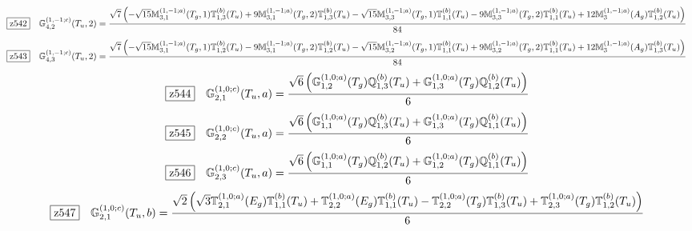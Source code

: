 \documentclass[fleqn,10pt,landscape]{jsarticle}
\begin{document}
\begin{dmath*}
\hspace*{3mm}\fbox{z542}\quad \mathbb{G}_{4,2}^{(1,-1;c)}(T_{u},2)=\frac{\sqrt{7} \left(- \sqrt{15} \mathbb{M}_{3,1}^{(1,-1;a)}(T_{g},1) \mathbb{T}_{1,3}^{(b)}(T_{u}) + 9 \mathbb{M}_{3,1}^{(1,-1;a)}(T_{g},2) \mathbb{T}_{1,3}^{(b)}(T_{u}) - \sqrt{15} \mathbb{M}_{3,3}^{(1,-1;a)}(T_{g},1) \mathbb{T}_{1,1}^{(b)}(T_{u}) - 9 \mathbb{M}_{3,3}^{(1,-1;a)}(T_{g},2) \mathbb{T}_{1,1}^{(b)}(T_{u}) + 12 \mathbb{M}_{3}^{(1,-1;a)}(A_{g}) \mathbb{T}_{1,2}^{(b)}(T_{u})\right)}{84}
\end{dmath*}
\begin{dmath*}
\hspace*{3mm}\fbox{z543}\quad \mathbb{G}_{4,3}^{(1,-1;c)}(T_{u},2)=\frac{\sqrt{7} \left(- \sqrt{15} \mathbb{M}_{3,1}^{(1,-1;a)}(T_{g},1) \mathbb{T}_{1,2}^{(b)}(T_{u}) - 9 \mathbb{M}_{3,1}^{(1,-1;a)}(T_{g},2) \mathbb{T}_{1,2}^{(b)}(T_{u}) - \sqrt{15} \mathbb{M}_{3,2}^{(1,-1;a)}(T_{g},1) \mathbb{T}_{1,1}^{(b)}(T_{u}) + 9 \mathbb{M}_{3,2}^{(1,-1;a)}(T_{g},2) \mathbb{T}_{1,1}^{(b)}(T_{u}) + 12 \mathbb{M}_{3}^{(1,-1;a)}(A_{g}) \mathbb{T}_{1,3}^{(b)}(T_{u})\right)}{84}
\end{dmath*}
\begin{dmath*}
\hspace*{3mm}\fbox{z544}\quad \mathbb{G}_{2,1}^{(1,0;c)}(T_{u},a)=\frac{\sqrt{6} \left(\mathbb{G}_{1,2}^{(1,0;a)}(T_{g}) \mathbb{Q}_{1,3}^{(b)}(T_{u}) + \mathbb{G}_{1,3}^{(1,0;a)}(T_{g}) \mathbb{Q}_{1,2}^{(b)}(T_{u})\right)}{6}
\end{dmath*}
\begin{dmath*}
\hspace*{3mm}\fbox{z545}\quad \mathbb{G}_{2,2}^{(1,0;c)}(T_{u},a)=\frac{\sqrt{6} \left(\mathbb{G}_{1,1}^{(1,0;a)}(T_{g}) \mathbb{Q}_{1,3}^{(b)}(T_{u}) + \mathbb{G}_{1,3}^{(1,0;a)}(T_{g}) \mathbb{Q}_{1,1}^{(b)}(T_{u})\right)}{6}
\end{dmath*}
\begin{dmath*}
\hspace*{3mm}\fbox{z546}\quad \mathbb{G}_{2,3}^{(1,0;c)}(T_{u},a)=\frac{\sqrt{6} \left(\mathbb{G}_{1,1}^{(1,0;a)}(T_{g}) \mathbb{Q}_{1,2}^{(b)}(T_{u}) + \mathbb{G}_{1,2}^{(1,0;a)}(T_{g}) \mathbb{Q}_{1,1}^{(b)}(T_{u})\right)}{6}
\end{dmath*}
\begin{dmath*}
\hspace*{3mm}\fbox{z547}\quad \mathbb{G}_{2,1}^{(1,0;c)}(T_{u},b)=\frac{\sqrt{2} \left(\sqrt{3} \mathbb{T}_{2,1}^{(1,0;a)}(E_{g}) \mathbb{T}_{1,1}^{(b)}(T_{u}) + \mathbb{T}_{2,2}^{(1,0;a)}(E_{g}) \mathbb{T}_{1,1}^{(b)}(T_{u}) - \mathbb{T}_{2,2}^{(1,0;a)}(T_{g}) \mathbb{T}_{1,3}^{(b)}(T_{u}) + \mathbb{T}_{2,3}^{(1,0;a)}(T_{g}) \mathbb{T}_{1,2}^{(b)}(T_{u})\right)}{6}
\end{dmath*}
\end{document}
